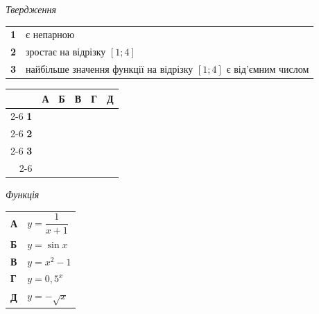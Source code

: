 \documentclass[14pt]{extarticle}
\begin{document}
\noindent
\begin{minipage}[t]{0.50\textwidth}
    \textit{Твердження} \par \vspace{0.2cm}
    \begin{tabular}{@{}p{0.5cm} p{6.5cm}@{}}
    \textbf{1} & є непарною \\
    \textbf{2} & зростає на відрізку $[1; 4]$ \\
    \textbf{3} & найбільше значення функції на відрізку $[1; 4]$ є від'ємним числом \\
    \end{tabular}
    
    \vspace{0.3cm}
    
    \begingroup
    \setlength{\tabcolsep}{4pt}
    \renewcommand{\arraystretch}{1.2}
    \small
    \begin{tabular}{r|c|c|c|c|c|}
         \multicolumn{1}{c}{} & \multicolumn{1}{c}{\textbf{А}} & \multicolumn{1}{c}{\textbf{Б}} & \multicolumn{1}{c}{\textbf{В}} & \multicolumn{1}{c}{\textbf{Г}} & \multicolumn{1}{c}{\textbf{Д}} \\ \cline{2-6}
         \textbf{1} & & & & & \\ \cline{2-6}
         \textbf{2} & & & & & \\ \cline{2-6}
         \textbf{3} & & & & & \\ \cline{2-6}
    \end{tabular}
    \endgroup
\end{minipage}%
\hfill
\begin{minipage}[t]{0.45\textwidth}
    \textit{Функція} \par \vspace{0.2cm}
    \begin{tabular}{ll}
    \textbf{А} & $y = \dfrac{1}{x+1}$ \\[0.3cm]
    \textbf{Б} & $y = \sin x$ \\[0.3cm]
    \textbf{В} & $y = x^2 - 1$ \\[0.3cm]
    \textbf{Г} & $y = 0{,}5^x$ \\[0.3cm]
    \textbf{Д} & $y = -\sqrt{x}$ \\
    \end{tabular}
\end{minipage}

\vspace{0.7cm}
\end{document}
